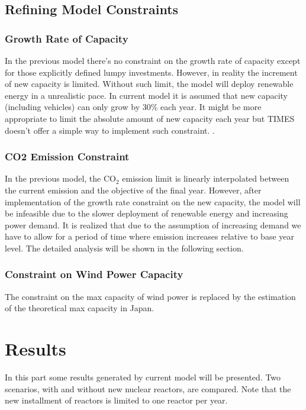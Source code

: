 \documentclass[14pt,a4paper]{article} %
\begin{document}
\subsection{Refining Model Constraints}

\subsubsection{Growth Rate of Capacity}
In the previous model there's no constraint on the growth rate of capacity except for those explicitly defined lumpy investments. However, in reality the increment of new capacity is limited. Without such limit, the model will deploy renewable energy in a unrealistic pace. In current model it is assumed that new capacity (including vehicles) can only grow by 30\% each year. It might be more appropriate to limit the absolute amount of new capacity each year but TIMES doesn't offer a simple way to implement such constraint.
.
\subsubsection{CO2 Emission Constraint}
In the previous model, the CO$_2$ emission limit is linearly interpolated between the current emission and the objective of the final year.
However, after implementation of the growth rate constraint on the new capacity, the model will be infeasible due to the slower deployment of renewable energy and increasing power demand. It is realized that due to the assumption of increasing demand we have to allow for a period of time where emission increases relative to base year level. The detailed analysis will be shown in the following section.

\subsubsection{Constraint on Wind Power Capacity}
The constraint on the max capacity of wind power is replaced by the estimation of the theoretical max capacity in Japan. \cite{heger_wind_2016}


\section{Results}

In this part some results generated by current model will be presented. Two scenarios, with and without new nuclear reactors, are compared. Note that the new installment of reactors is limited to one reactor per year.
\end{document}
